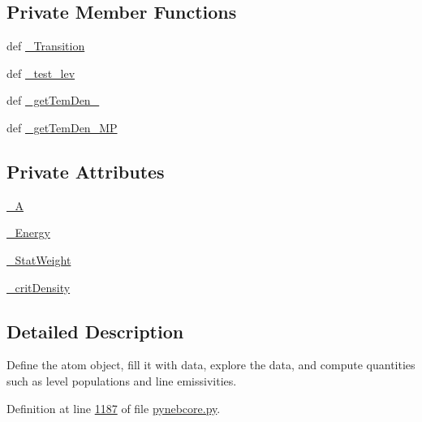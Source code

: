 \subsection*{Private Member Functions}
\begin{DoxyCompactItemize}
\item 
def \hyperlink{classpyneb_1_1core_1_1pynebcore_1_1_atom_a69f29cc10c77910841f9e3ff8ddef250}{\-\_\-\-Transition}
\item 
def \hyperlink{classpyneb_1_1core_1_1pynebcore_1_1_atom_afa4b9737dcd5bed31e25e8f0b6dc4730}{\-\_\-test\-\_\-lev}
\item 
def \hyperlink{classpyneb_1_1core_1_1pynebcore_1_1_atom_ad1d75f64b27a6acee079b5738b69dabe}{\-\_\-get\-Tem\-Den\-\_}
\item 
def \hyperlink{classpyneb_1_1core_1_1pynebcore_1_1_atom_a3a7c4f43d58a5988d04cbe23ed9593ba}{\-\_\-get\-Tem\-Den\-\_\-\-M\-P}
\end{DoxyCompactItemize}
\subsection*{Private Attributes}
\begin{DoxyCompactItemize}
\item 
\hyperlink{classpyneb_1_1core_1_1pynebcore_1_1_atom_aa6416fe661b8deaa008179314727e025}{\-\_\-\-A}
\item 
\hyperlink{classpyneb_1_1core_1_1pynebcore_1_1_atom_a52e68715246d258bf0a14f4bd06e89e4}{\-\_\-\-Energy}
\item 
\hyperlink{classpyneb_1_1core_1_1pynebcore_1_1_atom_a1e76c66b89eb327aeb4cdb1d8bd46fb5}{\-\_\-\-Stat\-Weight}
\item 
\hyperlink{classpyneb_1_1core_1_1pynebcore_1_1_atom_a1d0823a36ca030fd149522fe72908631}{\-\_\-crit\-Density}
\end{DoxyCompactItemize}


\subsection{Detailed Description}
\begin{DoxyVerb}Define the atom object, fill it with data, explore the data, and 
compute quantities such as level populations and line emissivities.\end{DoxyVerb}
 

Definition at line \hyperlink{pynebcore_8py_source_l01187}{1187} of file \hyperlink{pynebcore_8py_source}{pynebcore.\-py}.



